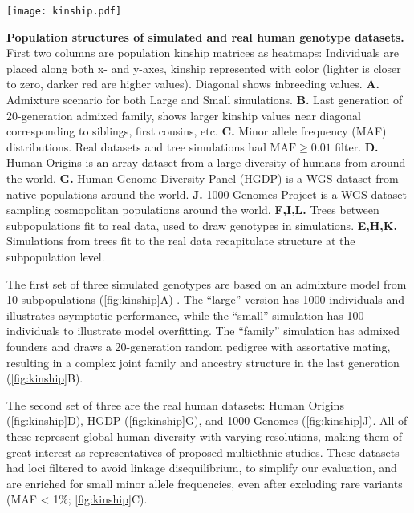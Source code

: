 \documentclass[11pt]{article}
\begin{document}
\begin{FPfigure}%
  \centering
  \texttt{[image: kinship.pdf]}
  \caption{
    {\bf Population structures of simulated and real human genotype datasets.}
    First two columns are population kinship matrices as heatmaps: 
    Individuals are placed along both x- and y-axes, kinship represented with color (lighter is closer to zero, darker red are higher values).
    Diagonal shows inbreeding values.
    \textbf{A.}
    Admixture scenario for both Large and Small simulations.
    \textbf{B.}
    Last generation of 20-generation admixed family, shows larger kinship values near diagonal corresponding to siblings, first cousins, etc.
    \textbf{C.}
    Minor allele frequency (MAF) distributions.
    Real datasets and tree simulations had $\text{MAF} \ge 0.01$ filter.
    \textbf{D.}
    Human Origins is an array dataset from a large diversity of humans from around the world.
    \textbf{G.}
    Human Genome Diversity Panel (HGDP) is a WGS dataset from native populations around the world.
    \textbf{J.}
    1000 Genomes Project is a WGS dataset sampling cosmopolitan populations around the world.
    \textbf{F,I,L.}
    Trees between subpopulations fit to real data, used to draw genotypes in simulations.
    \textbf{E,H,K.}
    Simulations from trees fit to the real data recapitulate structure at the subpopulation level.
  }
  \label{fig:kinship}
\end{FPfigure}


The first set of three simulated genotypes are based on an admixture model from 10 subpopulations (\cref{fig:kinship}A) \citep{ochoa_estimating_2021, gopalan_scaling_2016, cabreros_likelihood-free_2019}.
The ``large'' version has 1000 individuals and illustrates asymptotic performance, while the ``small'' simulation has 100 individuals to illustrate model overfitting.
The ``family'' simulation has admixed founders and draws a 20-generation random pedigree with assortative mating, resulting in a complex joint family and ancestry structure in the last generation (\cref{fig:kinship}B).

The second set of three are the real human datasets: Human Origins (\cref{fig:kinship}D), HGDP (\cref{fig:kinship}G), and 1000 Genomes (\cref{fig:kinship}J).
All of these represent global human diversity with varying resolutions, making them of great interest as representatives of proposed multiethnic studies.
These datasets had loci filtered to avoid linkage disequilibrium, to simplify our evaluation, and are enriched for small minor allele frequencies, even after excluding rare variants (MAF < 1\%; \cref{fig:kinship}C).
\end{document}
